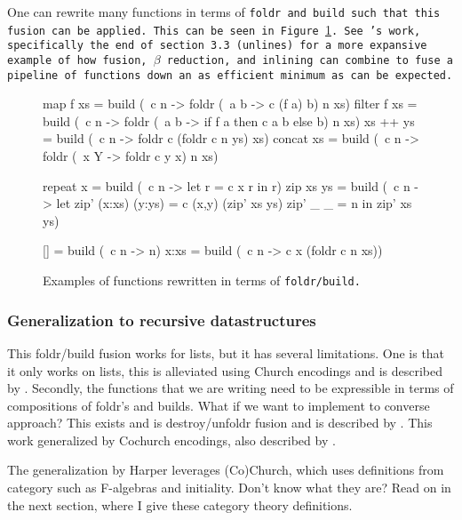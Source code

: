 One can rewrite many functions in terms of \tt{foldr} and \tt{build} such that this fusion can be applied. This can be seen in Figure \ref{fig:foldr/build_ex}.
See \cite{Gill1993}'s work, specifically the end of section 3.3 (\tt{unlines}) for a more expansive example of how fusion, $\beta$ reduction, and inlining can combine to fuse a pipeline of functions down an as efficient minimum as can be expected.
\begin{figure}[ht]
    \centering
    \begin{code}
    map f xs    = build (\ c n -> foldr (\ a b -> c (f a) b) n xs)
    filter f xs = build (\ c n -> foldr (\ a b -> if f a then c a b else b) n xs)
    xs ++ ys    = build (\ c n -> foldr c (foldr c n ys) xs)
    concat xs   = build (\ c n -> foldr (\ x Y -> foldr c y x) n xs)
    
    repeat x    = build (\ c n -> let r = c x r in r)
    zip xs ys   = build (\ c n -> let zip' (x:xs) (y:ys) = c (x,y) (zip' xs ys)
                                      zip' _      _      = n
                                      in zip' xs ys)

    []         = build (\ c n -> n)
    x:xs       = build (\ c n -> c x (foldr c n xs))
    \end{code}
    \caption{Examples of functions rewritten in terms of \tt{foldr/build}. \citep{Gill1993}}
    \label{fig:foldr/build_ex}
\end{figure}



\subsubsection{Generalization to recursive datastructures}
This foldr/build fusion works for lists, but it has several limitations.
One is that it only works on lists, this is alleviated using Church encodings and is described by \cite{Harper2011}.
Secondly, the functions that we are writing need to be expressible in terms of compositions of foldr's and builds. What if we want to implement to converse approach?
This exists and is destroy/unfoldr fusion and is described by \cite{Coutts2007}.
This work generalized by Cochurch encodings, also described by \cite{Harper2011}.

The generalization by Harper leverages (Co)Church, which uses definitions from category such as F-algebras and initiality.
Don't know what they are? Read on in the next section, where I give these category theory definitions.

